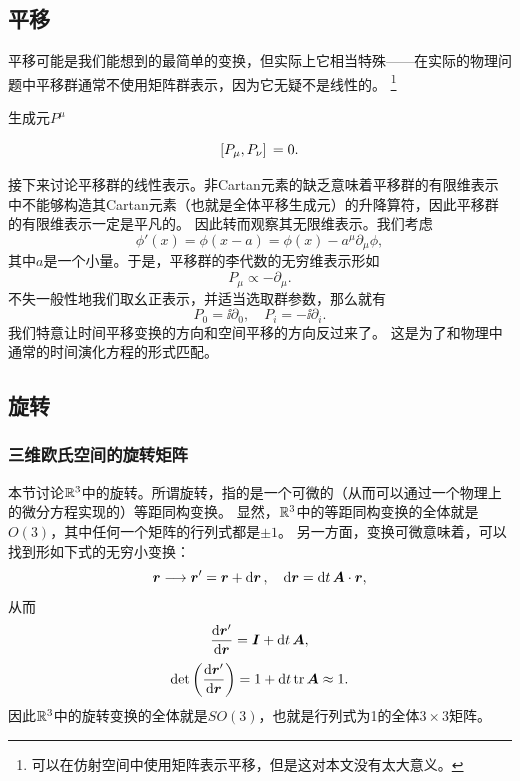 \subsection{平移}\label{sec:translation}

平移可能是我们能想到的最简单的变换，但实际上它相当特殊——在实际的物理问题中平移群通常不使用矩阵群表示，因为它无疑不是线性的。%
\footnote{可以在仿射空间中使用矩阵表示平移，但是这对本文没有太大意义。}

生成元$P^\mu$

\begin{equation}
    \comm*{P_\mu}{P_\nu} = 0.
    \label{eq:comm-of-trans}
\end{equation}

接下来讨论平移群的线性表示。非Cartan元素的缺乏意味着平移群的有限维表示中不能够构造其Cartan元素（也就是全体平移生成元）的升降算符，因此平移群的有限维表示一定是平凡的。
因此转而观察其无限维表示。我们考虑
\[
    \phi'(x) = \phi(x - a) = \phi(x) - a^\mu \partial_\mu \phi,
\]
其中$a$是一个小量。于是，平移群的李代数的无穷维表示形如
\[
    P_\mu \propto - \partial_\mu.
\]
不失一般性地我们取幺正表示，并适当选取群参数，那么就有
\begin{equation}
    P_0 = \ii \partial_0, \quad P_i = - \ii \partial_i.
    \label{eq:transition-inf-rep}
\end{equation}
我们特意让时间平移变换的方向和空间平移的方向反过来了。
这是为了和物理中通常的时间演化方程的形式匹配。

\subsection{旋转}\label{sec:rotation}

\subsubsection{三维欧氏空间的旋转矩阵}

本节讨论$\mathbb{R}^3$中的旋转。所谓旋转，指的是一个可微的（从而可以通过一个物理上的微分方程实现的）等距同构变换。
显然，$\mathbb{R}^3$中的等距同构变换的全体就是$O(3)$，其中任何一个矩阵的行列式都是$\pm 1$。
另一方面，变换可微意味着，可以找到形如下式的无穷小变换：
\[
    \vb*{r} \longrightarrow \vb*{r}' = \vb*{r} + \dd{\vb*{r}}, \quad \dd{\vb*{r}} = \dd{t} \vb*{A} \cdot \vb*{r},
\]
从而
\[
    \dv{\vb*{r}'}{\vb*{r}} = \vb*{I} + \dd{t} \vb*{A},
\]
\[
    \det \left( \dv{\vb*{r}'}{\vb*{r}} \right) = 1 + \dd{t} \trace \vb*{A} \approx 1.
\]
因此$\mathbb{R}^3$中的旋转变换的全体就是$SO(3)$，也就是行列式为1的全体$3\times 3$矩阵。

